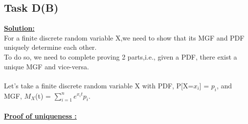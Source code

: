 \documentclass[12pt]{article}
\begin{document}
\subsection{Task D(B)}
\textbf{\underline{Solution:}}\\
For a finite discrete random variable X,we need to show that  its MGF and PDF uniquely determine each other.\\
To do so, we need to complete proving 2 parts,i.e., given a PDF, there exist a unique MGF and vice-versa.\\
\\
Let's take a finite discrete random variable X with PDF, P[X=$x_i$] = $p_i$, and MGF, $M_X$(t) = $\sum_{i=1}^ne^{x_it}p_i$.\\
\\
\textbf{\underline{Proof of uniqueness :}}
\\
\end{document}
